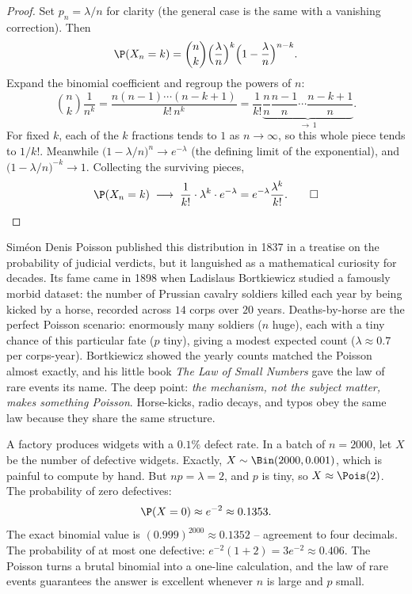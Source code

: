 \begin{proof}
Set $p_n = \lambda/n$ for clarity (the general case is the same with a vanishing
correction). Then
\[
  \P(X_n = k) = \binom{n}{k}\Bigl(\frac{\lambda}{n}\Bigr)^{k}
  \Bigl(1-\frac{\lambda}{n}\Bigr)^{n-k}.
\]
Expand the binomial coefficient and regroup the powers of $n$:
\[
  \binom{n}{k}\frac{1}{n^k}
  = \frac{n(n-1)\cdots(n-k+1)}{k!\,n^k}
  = \frac{1}{k!}\underbrace{\frac{n}{n}\frac{n-1}{n}\cdots\frac{n-k+1}{n}}_{\to\,1}.
\]
For fixed $k$, each of the $k$ fractions tends to $1$ as $n\to\infty$, so this
whole piece tends to $1/k!$. Meanwhile
$\bigl(1-\lambda/n\bigr)^{n} \to e^{-\lambda}$ (the defining limit of the
exponential), and $\bigl(1-\lambda/n\bigr)^{-k} \to 1$. Collecting the surviving
pieces,
\[
  \P(X_n = k) \;\longrightarrow\; \frac{1}{k!}\cdot \lambda^k \cdot e^{-\lambda}
  = e^{-\lambda}\frac{\lambda^k}{k!}. \qed
\]
\end{proof}

\begin{historybox}
Sim\'eon Denis Poisson published this distribution in 1837 in a treatise on the
probability of judicial verdicts, but it languished as a mathematical curiosity
for decades. Its fame came in 1898 when Ladislaus Bortkiewicz studied a famously
morbid dataset: the number of Prussian cavalry soldiers killed each year by being
kicked by a horse, recorded across $14$ corps over $20$ years. Deaths-by-horse are
the perfect Poisson scenario: enormously many soldiers ($n$ huge), each with a
tiny chance of this particular fate ($p$ tiny), giving a modest expected count
($\lambda \approx 0.7$ per corps-year). Bortkiewicz showed the yearly counts
matched the Poisson almost exactly, and his little book \emph{The Law of Small
Numbers} gave the law of rare events its name. The deep point: \emph{the
mechanism, not the subject matter, makes something Poisson}. Horse-kicks, radio
decays, and typos obey the same law because they share the same structure.
\end{historybox}

\begin{example}
\label{ch07:ex-poisapprox}
A factory produces widgets with a $0.1\%$ defect rate. In a batch of $n = 2000$,
let $X$ be the number of defective widgets. Exactly, $X \sim \Bin(2000, 0.001)$,
which is painful to compute by hand. But $np = \lambda = 2$, and $p$ is tiny, so
$X \approx \Pois(2)$. The probability of zero defectives:
\[
  \P(X = 0) \approx e^{-2} \approx 0.1353.
\]
The exact binomial value is $(0.999)^{2000} \approx 0.1352$ -- agreement to four
decimals. The probability of at most one defective:
$e^{-2}(1 + 2) = 3e^{-2} \approx 0.406$. The Poisson turns a brutal binomial into
a one-line calculation, and the law of rare events guarantees the answer is
excellent whenever $n$ is large and $p$ small.
\end{example}

